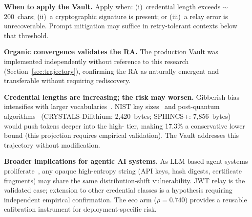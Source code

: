 \textbf{When to apply the Vault.}
Apply when: (i)~credential length exceeds $\sim$200~chars;
(ii)~a cryptographic signature is present; or (iii)~a relay error is unrecoverable.
Prompt mitigation may suffice in retry-tolerant contexts below that threshold.

\textbf{Organic convergence validates the RA.}
The production Vault was implemented independently without reference to
this research (Section~\ref{sec:trajectory}), confirming the RA as
naturally emergent and transferable without requiring rediscovery.

\textbf{Credential lengths are increasing; the risk may worsen.}
Gibberish bias intensifies with larger vocabularies~\cite{chen2026gibberish}.
NIST key sizes~\cite{barker2020nistkeys} and post-quantum
algorithms~\cite{nist2024pqc} (CRYSTALS-Dilithium: 2{,}420~bytes; SPHINCS+:
7{,}856~bytes) would push tokens deeper into the high-\DFR{} tier, making 17.3\% a
conservative lower bound (this projection requires empirical validation). The
Vault addresses this trajectory without modification.

\textbf{Broader implications for agentic AI systems.}
As LLM-based agent systems proliferate~\cite{wang2024survey}, any opaque
high-entropy string (API keys, hash digests, certificate fragments) may share
the same distribution-shift vulnerability. JWT relay is the validated case;
extension to other credential classes is a hypothesis requiring independent
empirical confirmation. The eco arm
($\rho\!=\!0.740$) provides a reusable calibration instrument for
deployment-specific risk.
